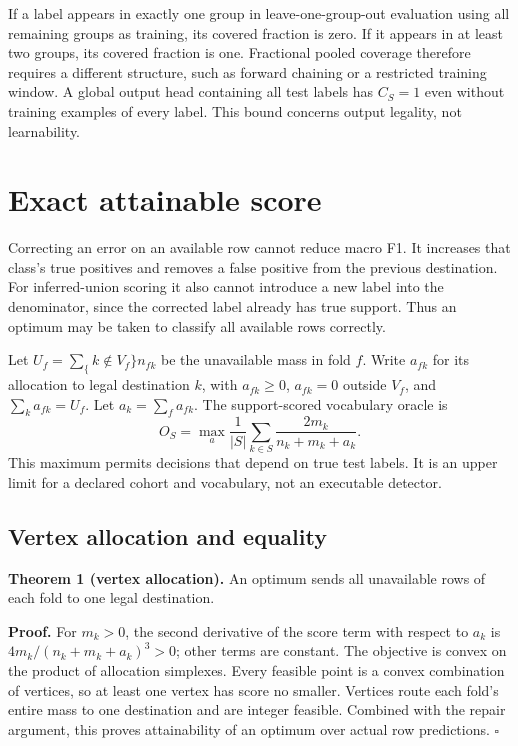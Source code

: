 \documentclass[twocolumn]{svjour3}
\begin{document}
If a label appears in exactly one group in leave-one-group-out evaluation using all remaining groups as training, its covered fraction is zero. If it appears in at least two groups, its covered fraction is one. Fractional pooled coverage therefore requires a different structure, such as forward chaining or a restricted training window. A global output head containing all test labels has $C_S=1$ even without training examples of every label. This bound concerns output legality, not learnability.

\section{Exact attainable score}
Correcting an error on an available row cannot reduce macro F1. It increases that class's true positives and removes a false positive from the previous destination. For inferred-union scoring it also cannot introduce a new label into the denominator, since the corrected label already has true support. Thus an optimum may be taken to classify all available rows correctly.

Let $U_f=\sum_\{k \notin V_f\} n_{f k}$ be the unavailable mass in fold $f$. Write $a_{f k}$ for its allocation to legal destination $k$, with $a_{f k}\ge 0$, $a_{f k}=0$ outside $V_f$, and $\sum_k a_{f k}=U_f$. Let $a_k=\sum_f a_{f k}$. The support-scored vocabulary oracle is
\begin{equation}O_S=\max_a\frac1{|S|}\sum_{k\in S}\frac{2m_k}{n_k+m_k+a_k}.\end{equation}
This maximum permits decisions that depend on true test labels. It is an upper limit for a declared cohort and vocabulary, not an executable detector.

\subsection{Vertex allocation and equality}
\textbf{Theorem 1 (vertex allocation).} An optimum sends all unavailable rows of each fold to one legal destination.

\textbf{Proof.} For $m_k>0$, the second derivative of the score term with respect to $a_k$ is $4m_k/(n_k+m_k+a_k)^3>0$; other terms are constant. The objective is convex on the product of allocation simplexes. Every feasible point is a convex combination of vertices, so at least one vertex has score no smaller. Vertices route each fold's entire mass to one destination and are integer feasible. Combined with the repair argument, this proves attainability of an optimum over actual row predictions. $\square$
\end{document}
